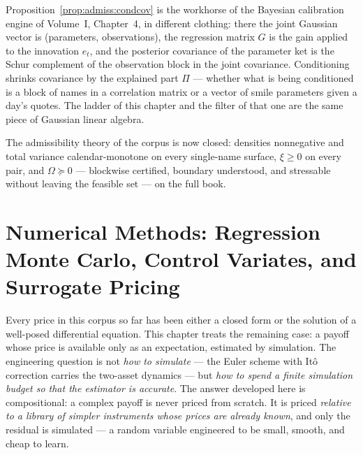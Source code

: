 \begin{remark}
\label{rem:admiss:kalman}
Proposition~\ref{prop:admiss:condcov} is the workhorse of the Bayesian
calibration engine of Volume~I, Chapter~4, in different clothing: there the
joint Gaussian vector is (parameters, observations), the regression matrix
$G$ is the gain applied to the innovation $e_t$, and the posterior
covariance of the parameter ket is the Schur complement of the observation
block in the joint covariance. Conditioning shrinks covariance by the
explained part $\Pi$ --- whether what is being conditioned is a block of
names in a correlation matrix or a vector of smile parameters given a day's
quotes. The ladder of this chapter and the filter of that one are the same
piece of Gaussian linear algebra.
\end{remark}

The admissibility theory of the corpus is now closed: densities
nonnegative and total variance calendar-monotone on every single-name
surface, $\xi \ge 0$ on every pair, and
$\Omega \succeq 0$ --- blockwise certified, boundary understood, and
stressable without leaving the feasible set --- on the full book.

\chapter{Numerical Methods: Regression Monte Carlo, Control Variates, and Surrogate Pricing}
\label{chap:numerics}

Every price in this corpus so far has been either a closed form or the solution
of a well-posed differential equation. This chapter treats the remaining case:
a payoff whose price is available only as an expectation, estimated by
simulation. The engineering question is not \emph{how to simulate} --- the Euler
scheme with It\^o correction carries the two-asset dynamics ---
but \emph{how to spend a finite simulation budget so that the estimator is
accurate}. The answer developed here is compositional: a complex payoff is
never priced from scratch. It is priced \emph{relative to a library of simpler
instruments whose prices are already known}, and only the residual is
simulated --- a random variable engineered to be small, smooth, and cheap to
learn.

